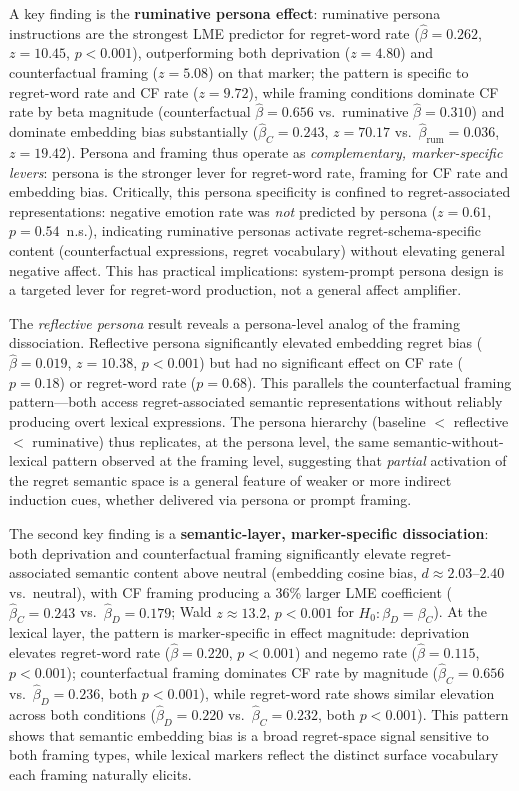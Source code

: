\documentclass[11pt]{article}
\begin{document}
A key finding is the \textbf{ruminative persona effect}: ruminative persona instructions are the strongest LME predictor for regret-word rate ($\hat{\beta}=0.262$, $z=10.45$, $p<0.001$), outperforming both deprivation ($z=4.80$) and counterfactual framing ($z=5.08$) on that marker; the pattern is specific to regret-word rate and CF rate ($z=9.72$), while framing conditions dominate CF rate by beta magnitude (counterfactual $\hat{\beta}=0.656$ vs.\ ruminative $\hat{\beta}=0.310$) and dominate embedding bias substantially ($\hat{\beta}_C=0.243$, $z=70.17$ vs.\ $\hat{\beta}_\text{rum}=0.036$, $z=19.42$). Persona and framing thus operate as \emph{complementary, marker-specific levers}: persona is the stronger lever for regret-word rate, framing for CF rate and embedding bias. Critically, this persona specificity is confined to regret-associated representations: negative emotion rate was \emph{not} predicted by persona ($z=0.61$, $p=0.54$~n.s.), indicating ruminative personas activate regret-schema-specific content (counterfactual expressions, regret vocabulary) without elevating general negative affect. This has practical implications: system-prompt persona design is a targeted lever for regret-word production, not a general affect amplifier.

The \emph{reflective persona} result reveals a persona-level analog of the framing dissociation. Reflective persona significantly elevated embedding regret bias ($\hat{\beta}=0.019$, $z=10.38$, $p<0.001$) but had no significant effect on CF rate ($p=0.18$) or regret-word rate ($p=0.68$). This parallels the counterfactual framing pattern---both access regret-associated semantic representations without reliably producing overt lexical expressions. The persona hierarchy (baseline $<$ reflective $<$ ruminative) thus replicates, at the persona level, the same semantic-without-lexical pattern observed at the framing level, suggesting that \emph{partial} activation of the regret semantic space is a general feature of weaker or more indirect induction cues, whether delivered via persona or prompt framing.

The second key finding is a \textbf{semantic-layer, marker-specific dissociation}: both deprivation and counterfactual framing significantly elevate regret-associated semantic content above neutral (embedding cosine bias, $d\approx2.03$--$2.40$ vs.\ neutral), with CF framing producing a 36\% larger LME coefficient ($\hat{\beta}_C=0.243$ vs.\ $\hat{\beta}_D=0.179$; Wald $z\approx13.2$, $p<0.001$ for $H_0\!:\beta_D=\beta_C$). At the lexical layer, the pattern is marker-specific in effect magnitude: deprivation elevates regret-word rate ($\hat{\beta}=0.220$, $p<0.001$) and negemo rate ($\hat{\beta}=0.115$, $p<0.001$); counterfactual framing dominates CF rate by magnitude ($\hat{\beta}_C=0.656$ vs.\ $\hat{\beta}_D=0.236$, both $p<0.001$), while regret-word rate shows similar elevation across both conditions ($\hat{\beta}_D=0.220$ vs.\ $\hat{\beta}_C=0.232$, both $p<0.001$). This pattern shows that semantic embedding bias is a broad regret-space signal sensitive to both framing types, while lexical markers reflect the distinct surface vocabulary each framing naturally elicits.
\end{document}
